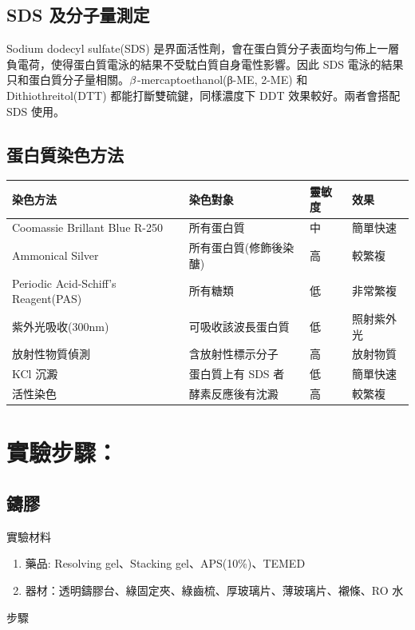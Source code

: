 \subsection{SDS 及分子量測定}

Sodium dodecyl sulfate(SDS) 是界面活性劑，會在蛋白質分子表面均勻佈上一層負電荷，使得蛋白質電泳的結果不受馾白質自身電性影響。因此 SDS 電泳的結果只和蛋白質分子量相關。$\ce{\beta}$-mercaptoethanol(β-ME, 2-ME) 和 Dithiothreitol(DTT) 都能打斷雙硫鍵，同樣濃度下 DDT 效果較好。兩者會搭配 SDS 使用。

\subsection{蛋白質染色方法}

\begin{table}[ht]




\begin{tabular}{llll}
\toprule
染色方法 &染色對象 &靈敏度 &效果 \\
\midrule
Coomassie Brillant Blue R-250 &所有蛋白質 &中&簡單快速\\
Ammonical Silver &所有蛋白質(修飾後染醣) &高&較繁複\\
Periodic Acid-Schiff's Reagent(PAS) &所有糖類&低&非常繁複\\
紫外光吸收(300nm) &可吸收該波長蛋白質 &低&照射紫外光 \\
放射性物質偵測&含放射性標示分子 &高&放射物質 \\
KCl 沉澱&蛋白質上有 SDS 者 &低&簡單快速 \\
活性染色 &酵素反應後有沈澱 &高& 較繁複\\
\bottomrule
\end{tabular}\end{table}




\section{實驗步驟：}

\subsection{鑄膠}

\hspace*{-2em}實驗材料
\begin{enumerate}[label=\arabic*.]
  \item 藥品: Resolving gel、Stacking gel、APS(10\%)、TEMED
  \item 器材：透明鑄膠台、綠固定夾、綠齒梳、厚玻璃片、薄玻璃片、襯條、RO 水
\end{enumerate}
\newpage
\hspace*{-2em}步驟

